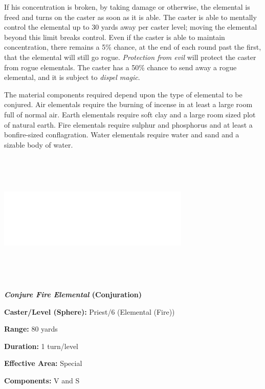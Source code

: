\begin{multicols}{2}
If his concentration is broken, by taking damage or otherwise, the elemental is freed and turns on the caster as soon as it is able.  The caster is able to mentally control the elemental up to 30 yards away per caster level; moving the elemental beyond this limit breaks control.  Even if the caster is able to maintain concentration, there remains a 5\% chance, at the end of each round past the first, that the elemental will still go rogue.  \textit{Protection from evil} will protect the caster from rogue elementals.  The caster has a 50\% chance to send away a rogue elemental, and it is subject to \textit{dispel magic}.

The material components required depend upon the type of elemental to be conjured.  Air elementals require the burning of incense in at least a large room full of normal air.  Earth elementals require soft clay and a large room sized plot of natural earth.  Fire elementals require sulphur and phosphorus and at least a bonfire-sized conflagration.  Water elementals require water and sand and a sizable body of water.

\noindent\includegraphics[width=3.6in, height=2.5in]{testblock.pdf}

\vspace{1em}

\noindent
\begin{minipage}{\columnwidth}

\noindent \textbf{\textit{Conjure Fire Elemental} (Conjuration)}

\noindent \textbf{Caster/Level (Sphere):} Priest/6 (Elemental (Fire))

\noindent \textbf{Range:} 80 yards

\noindent \textbf{Duration:} 1 turn/level

\noindent \textbf{Effective Area:} Special

\noindent \textbf{Components:} V and S


\end{minipage}
\end{multicols}
